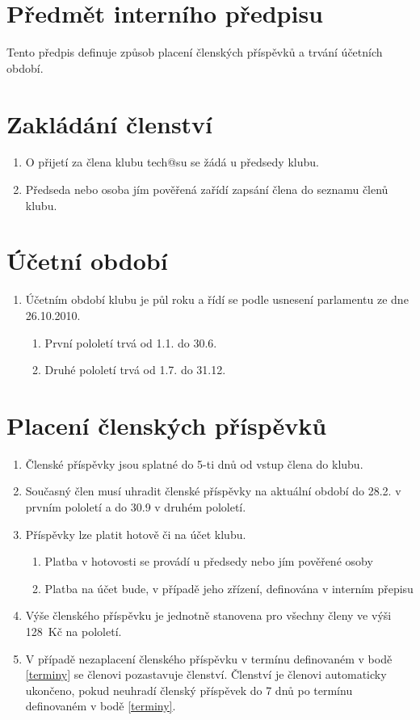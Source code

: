 \documentclass[10pt]{article}
\begin{document}
\section{Předmět interního předpisu}
	Tento předpis definuje způsob placení členských příspěvků a trvání účetních období.

\section{Zakládání členství}
	\begin{enumerate}
		\item O přijetí za člena klubu tech@su se žádá u předsedy klubu.
		\item Předseda nebo osoba jím pověřená zařídí zapsání člena do seznamu členů klubu.
	\end{enumerate}
\section{Účetní období}
	\begin{enumerate}
		\item Účetním období klubu je půl roku a řídí se podle usnesení parlamentu ze dne 26.10.2010.
		\begin{enumerate}
			\item První pololetí trvá od 1.1. do 30.6.
			\item Druhé pololetí trvá od 1.7. do 31.12.
		\end{enumerate}
	\end{enumerate}
\section{Placení členských příspěvků}
	\begin{enumerate}
		\item Členské příspěvky jsou splatné do 5-ti dnů od vstup člena do klubu.
		\item \label{terminy} Současný člen musí uhradit členské příspěvky na aktuální období do 28.2. v prvním pololetí a do 30.9 v druhém pololetí.

		\item Příspěvky lze platit hotově či na účet klubu.
			\begin{enumerate}
				\item Platba v hotovosti se provádí u předsedy nebo jím pověřené osoby
				\item Platba na účet bude, v případě jeho zřízení, definována v interním přepisu
			\end{enumerate}
		\item Výše členského příspěvku je jednotně stanovena pro všechny členy ve výši 128~Kč na pololetí.
		\item V případě nezaplacení členského příspěvku v termínu definovaném v bodě \ref{terminy} se členovi pozastavuje členství. Členství je členovi automaticky ukončeno, pokud neuhradí členský příspěvek do 7 dnů po termínu definovaném v bodě \ref{terminy}.

	\end{enumerate}
\end{document}
